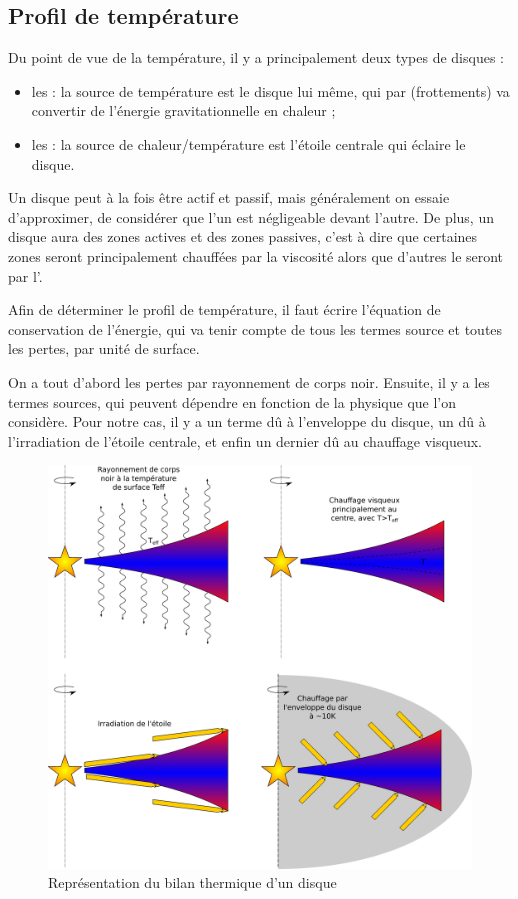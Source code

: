 \subsection{Profil de température}
Du point de vue de la température, il y a principalement deux types de disques : 
\begin{itemize}
\item les  : la source de température est le disque lui même, qui par  (frottements) va convertir de l'énergie gravitationnelle en chaleur ;
\item les  : la source de chaleur/température est l'étoile centrale qui éclaire le disque. 
\end{itemize}

Un disque peut à la fois être actif et passif, mais généralement on essaie d'approximer, de considérer que l'un est négligeable devant l'autre. De plus, un disque aura des zones actives et des zones passives, c'est à dire que certaines zones seront principalement chauffées par la viscosité alors que d'autres le seront par l'.

\bigskip

Afin de déterminer le profil de température, il faut écrire l'équation de conservation de l'énergie, qui va tenir compte de tous les termes source et toutes les pertes, par unité de surface.

On a tout d'abord les pertes par rayonnement de corps noir. Ensuite, il y a les termes sources, qui peuvent dépendre en fonction de la physique que l'on considère. Pour notre cas, il y a un terme dû à l'enveloppe du disque, un dû à l'irradiation de l'étoile centrale, et enfin un dernier dû au chauffage visqueux.


\begin{figure}[htb]
\centering
\includegraphics[width=0.45\linewidth]{figure/disk_energy.pdf}
\caption{Représentation du bilan thermique d'un disque}\label{fig:energy_equilibrium}
\end{figure}

